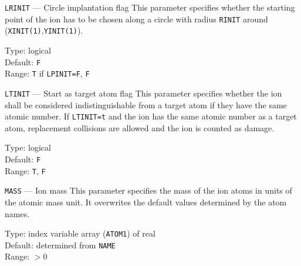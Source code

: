 \ifprivate
\begin{keydescription}{\texttt{LRINIT} --- Circle implantation flag}
%
  This parameter specifies whether the starting point of the ion has to
  be chosen along a circle with radius \texttt{RINIT} around
  (\texttt{XINIT(1)},\texttt{YINIT(1)}).
%
  \begin{keytab}
    Type:    \> logical \\
    Default: \> \texttt{F} \\
    Range:   \> \texttt{T} if \texttt{LPINIT=F}, \texttt{F}
  \end{keytab}
\end{keydescription}
\fi

\begin{keydescription}{\texttt{LTINIT} --- Start as target atom flag}
%
  This parameter specifies whether the ion shall be considered
  indistinguishable from a target atom if they have the same atomic
  number.  If \texttt{LTINIT=t} and the ion has the same atomic number
  as a target atom, replacement collisions are allowed and the ion is
  counted as damage.
%
  \begin{keytab}
    Type:    \> logical \\
    Default: \> \texttt{F} \\
    Range:   \> \texttt{T}, \texttt{F}
  \end{keytab}
\end{keydescription}

\begin{keydescription}{\texttt{MASS} --- Ion mass}
%
  This parameter specifies the mass of the ion atoms in units of the
  atomic mass unit.  It overwrites the default values determined by
  the atom names.
%
  \begin{keytab}
    Type:    \> index variable array (\texttt{ATOM1}) of real \\
    Default: \> determined from \texttt{NAME} \\
    Range: \> $> 0$
  \end{keytab}
\end{keydescription}

